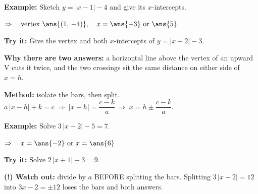 \documentclass[12pt]{article}
\begin{document}
\begin{examplebox}
\textbf{Example:} \quad Sketch $y = |x - 1| - 4$ and give its $x$-intercepts.

$\Rightarrow\quad \text{vertex } \ans{(1,\,-4)}, \quad x = \ans{-3} \text{ or } \ans{5}$
\end{examplebox}

\begin{tryitbox}
\textbf{Try it:} \quad Give the vertex and both $x$-intercepts of $y = |x + 2| - 3$.\\[2pt]
\end{tryitbox}


\begin{formulabox}
\textbf{Why there are two answers:} a horizontal line above the vertex of an upward V cuts it twice, and the two crossings sit the same distance on either side of $x = h$.\par
\textbf{Method:} isolate the bars, then split. \ $a\,|x - h| + k = c \ \Rightarrow \ |x - h| = \dfrac{c - k}{a} \ \Rightarrow \ x = h \pm \dfrac{c - k}{a}$.
\end{formulabox}

\begin{examplebox}
\textbf{Example:} \quad Solve $3\,|x - 2| - 5 = 7$.

$\Rightarrow\quad x = \ans{-2} \text{ or } x = \ans{6}$
\end{examplebox}

\begin{tryitbox}
\textbf{Try it:} \quad Solve $2\,|x + 1| - 3 = 9$.\\[2pt]
\end{tryitbox}

\begin{watchoutbox}
\textbf{(!) Watch out:} divide by $a$ BEFORE splitting the bars. Splitting $3\,|x - 2| = 12$ into $3x - 2 = \pm 12$ loses the bars and both answers.
\end{watchoutbox}
\end{document}
